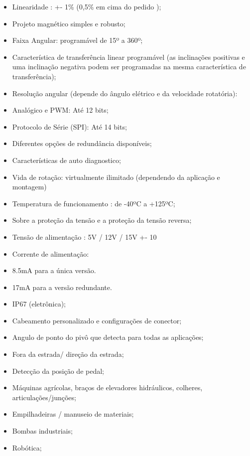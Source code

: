 \begin{itemize}
  \item Linearidade : +- 1\% (0,5\% em cima do pedido );
  \item Projeto magnético simples e robusto;
  \item Faixa Angular: programável de 15º a 360º;
  \item Característica de transferência linear programável (as inclinações positivas e
  uma inclinação negativa podem ser programadas na mesma característica de transferência);

  \item Resolução angular (depende do ângulo elétrico e da velocidade rotatória):
  \item Analógico e PWM: Até 12 bits;
  \item Protocolo de Série (SPI): Até 14 bits;
  \item Diferentes opções de redundância disponíveis;
  \item Características de auto diagnostico;
  \item Vida de rotação: virtualmente ilimitado (dependendo da aplicação e montagem)
  \item Temperatura de funcionamento : de -40ºC a +125ºC;
  \item Sobre a proteção da tensão e a proteção da tensão reversa;
  \item Tensão de alimentação : 5V / 12V / 15V +- 10%
  \item Corrente de alimentação:
  \item 8.5mA para a única versão.
  \item 17mA para a versão redundante.
  \item IP67 (eletrônica);
  \item Cabeamento personalizado e configurações de conector;
\end{itemize}


\begin{itemize}
  \item  Angulo de ponto do pivô que detecta para todas as aplicações;
  \item Fora da estrada/ direção da estrada;
  \item Detecção da posição de pedal;

  \item Máquinas agrícolas, braços de elevadores hidráulicos, colheres, articulações/junções;

  \item Empilhadeiras / manuseio de materiais;

  \item Bombas industriais;

  \item Robótica;

\end{itemize}


